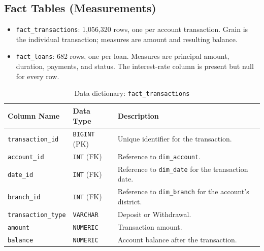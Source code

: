 \subsection{Fact Tables (Measurements)}
\begin{itemize}
    \item \texttt{fact\_transactions}: 1,056,320 rows, one per account transaction. Grain is the individual transaction; measures are amount and resulting balance.
    \item \texttt{fact\_loans}: 682 rows, one per loan. Measures are principal amount, duration, payments, and status. The interest-rate column is present but null for every row.
\end{itemize}

\begin{table}[H]
    \centering
    \renewcommand{\arraystretch}{1.3}
    \begin{tabularx}{\textwidth}{|>{\raggedright\arraybackslash}l|>{\raggedright\arraybackslash}l|>{\raggedright\arraybackslash}X|}
        \hline
        \textbf{Column Name} & \textbf{Data Type} & \textbf{Description} \\
        \hline
        \texttt{transaction\_id} & \texttt{BIGINT} (PK) & Unique identifier for the transaction. \\
        \texttt{account\_id} & \texttt{INT} (FK) & Reference to \texttt{dim\_account}. \\
        \texttt{date\_id} & \texttt{INT} (FK) & Reference to \texttt{dim\_date} for the transaction date. \\
        \texttt{branch\_id} & \texttt{INT} (FK) & Reference to \texttt{dim\_branch} for the account's district. \\
        \texttt{transaction\_type} & \texttt{VARCHAR} & Deposit or Withdrawal. \\
        \texttt{amount} & \texttt{NUMERIC} & Transaction amount. \\
        \texttt{balance} & \texttt{NUMERIC} & Account balance after the transaction. \\
        \hline
    \end{tabularx}
    \caption{Data dictionary: \texttt{fact\_transactions}}
    \label{tab:dict_transactions}
\end{table}

